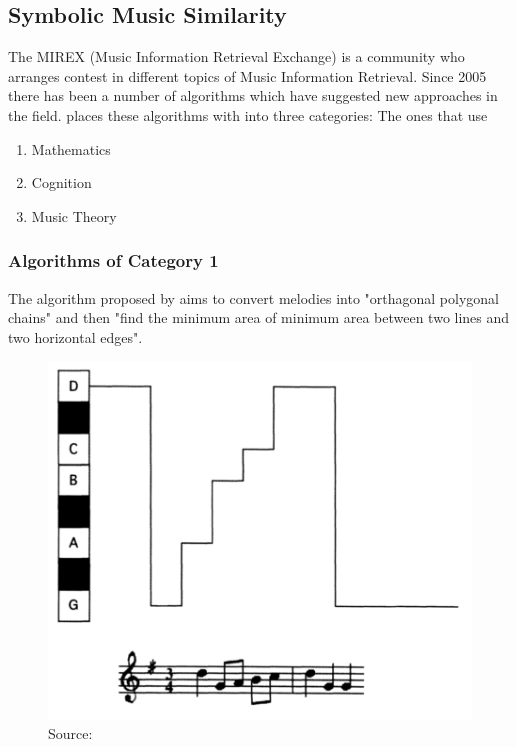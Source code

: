 \documentclass{article}
\begin{document}
		\subsection{Symbolic Music Similarity}

			The MIREX (Music Information Retrieval Exchange) is a community who arranges contest in different topics of Music Information Retrieval. Since 2005 there has been a number of algorithms which have suggested new approaches in the field.
			\cite{two} places these algorithms with into three categories:
				The ones that use \label{categories}
				\begin{enumerate}
					\item Mathematics
					\item Cognition
					\item Music Theory
				\end{enumerate}

			\subsubsection{Algorithms of Category 1}
				The algorithm proposed by \cite{one} aims to convert melodies into "orthagonal polygonal chains" and then "find the minimum area of 
				minimum area between two lines and two horizontal edges".

 
 				\begin{figure}[h!]
					\includegraphics[width=\textwidth,height=\textheight,keepaspectratio]{figure_1_of_1}
					\caption{Source: \cite{one}}
				\end{figure}
\end{document}
